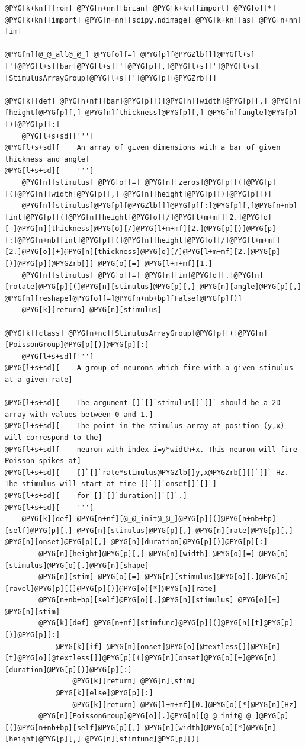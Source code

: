 \documentclass[letterpaper,10pt,english]{manual}
\begin{document}
\begin{Verbatim}[commandchars=@\[\]]
@PYG[k+kn][from] @PYG[n+nn][brian] @PYG[k+kn][import] @PYG[o][*]
@PYG[k+kn][import] @PYG[n+nn][scipy.ndimage] @PYG[k+kn][as] @PYG[n+nn][im]

@PYG[n][@_@_all@_@_] @PYG[o][=] @PYG[p][@PYGZlb[]]@PYG[l+s][']@PYG[l+s][bar]@PYG[l+s][']@PYG[p][,]@PYG[l+s][']@PYG[l+s][StimulusArrayGroup]@PYG[l+s][']@PYG[p][@PYGZrb[]]

@PYG[k][def] @PYG[n+nf][bar]@PYG[p][(]@PYG[n][width]@PYG[p][,] @PYG[n][height]@PYG[p][,] @PYG[n][thickness]@PYG[p][,] @PYG[n][angle]@PYG[p][)]@PYG[p][:]
    @PYG[l+s+sd][''']
@PYG[l+s+sd][    An array of given dimensions with a bar of given thickness and angle]
@PYG[l+s+sd][    ''']
    @PYG[n][stimulus] @PYG[o][=] @PYG[n][zeros]@PYG[p][(]@PYG[p][(]@PYG[n][width]@PYG[p][,] @PYG[n][height]@PYG[p][)]@PYG[p][)]
    @PYG[n][stimulus]@PYG[p][@PYGZlb[]]@PYG[p][:]@PYG[p][,]@PYG[n+nb][int]@PYG[p][(]@PYG[n][height]@PYG[o][/]@PYG[l+m+mf][2.]@PYG[o][-]@PYG[n][thickness]@PYG[o][/]@PYG[l+m+mf][2.]@PYG[p][)]@PYG[p][:]@PYG[n+nb][int]@PYG[p][(]@PYG[n][height]@PYG[o][/]@PYG[l+m+mf][2.]@PYG[o][+]@PYG[n][thickness]@PYG[o][/]@PYG[l+m+mf][2.]@PYG[p][)]@PYG[p][@PYGZrb[]] @PYG[o][=] @PYG[l+m+mf][1.]
    @PYG[n][stimulus] @PYG[o][=] @PYG[n][im]@PYG[o][.]@PYG[n][rotate]@PYG[p][(]@PYG[n][stimulus]@PYG[p][,] @PYG[n][angle]@PYG[p][,] @PYG[n][reshape]@PYG[o][=]@PYG[n+nb+bp][False]@PYG[p][)]
    @PYG[k][return] @PYG[n][stimulus]

@PYG[k][class] @PYG[n+nc][StimulusArrayGroup]@PYG[p][(]@PYG[n][PoissonGroup]@PYG[p][)]@PYG[p][:]
    @PYG[l+s+sd][''']
@PYG[l+s+sd][    A group of neurons which fire with a given stimulus at a given rate]

@PYG[l+s+sd][    The argument []`[]`stimulus[]`[]` should be a 2D array with values between 0 and 1.]
@PYG[l+s+sd][    The point in the stimulus array at position (y,x) will correspond to the]
@PYG[l+s+sd][    neuron with index i=y*width+x. This neuron will fire Poisson spikes at]
@PYG[l+s+sd][    []`[]`rate*stimulus@PYGZlb[]y,x@PYGZrb[][]`[]` Hz. The stimulus will start at time []`[]`onset[]`[]`]
@PYG[l+s+sd][    for []`[]`duration[]`[]`.]
@PYG[l+s+sd][    ''']
    @PYG[k][def] @PYG[n+nf][@_@_init@_@_]@PYG[p][(]@PYG[n+nb+bp][self]@PYG[p][,] @PYG[n][stimulus]@PYG[p][,] @PYG[n][rate]@PYG[p][,] @PYG[n][onset]@PYG[p][,] @PYG[n][duration]@PYG[p][)]@PYG[p][:]
        @PYG[n][height]@PYG[p][,] @PYG[n][width] @PYG[o][=] @PYG[n][stimulus]@PYG[o][.]@PYG[n][shape]
        @PYG[n][stim] @PYG[o][=] @PYG[n][stimulus]@PYG[o][.]@PYG[n][ravel]@PYG[p][(]@PYG[p][)]@PYG[o][*]@PYG[n][rate]
        @PYG[n+nb+bp][self]@PYG[o][.]@PYG[n][stimulus] @PYG[o][=] @PYG[n][stim]
        @PYG[k][def] @PYG[n+nf][stimfunc]@PYG[p][(]@PYG[n][t]@PYG[p][)]@PYG[p][:]
            @PYG[k][if] @PYG[n][onset]@PYG[o][@textless[]]@PYG[n][t]@PYG[o][@textless[]]@PYG[p][(]@PYG[n][onset]@PYG[o][+]@PYG[n][duration]@PYG[p][)]@PYG[p][:]
                @PYG[k][return] @PYG[n][stim]
            @PYG[k][else]@PYG[p][:]
                @PYG[k][return] @PYG[l+m+mf][0.]@PYG[o][*]@PYG[n][Hz]
        @PYG[n][PoissonGroup]@PYG[o][.]@PYG[n][@_@_init@_@_]@PYG[p][(]@PYG[n+nb+bp][self]@PYG[p][,] @PYG[n][width]@PYG[o][*]@PYG[n][height]@PYG[p][,] @PYG[n][stimfunc]@PYG[p][)]


\end{Verbatim}
\end{document}
